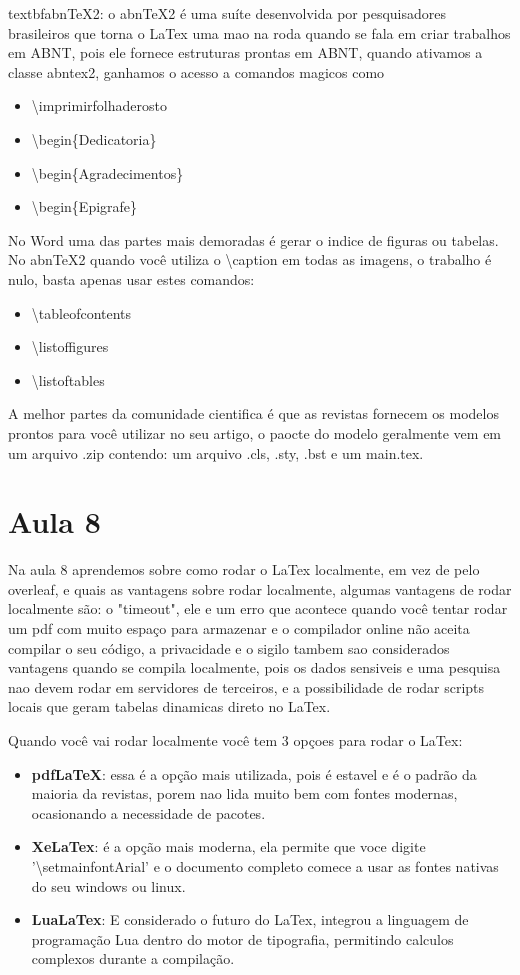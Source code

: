 textbf{abnTeX2}: o abnTeX2 é uma suíte desenvolvida por pesquisadores brasileiros que torna o LaTex uma mao na roda quando se fala em criar trabalhos em ABNT, pois ele fornece estruturas prontas em ABNT, quando ativamos a classe abntex2, ganhamos o acesso a comandos magicos como 
\begin{itemize}
    \item \textbackslash imprimirfolhaderosto
    \item \textbackslash begin\{Dedicatoria\}
    \item \textbackslash begin\{Agradecimentos\}
    \item \textbackslash begin\{Epigrafe\}
\end{itemize}


No Word uma das partes mais demoradas é gerar o indice de figuras ou tabelas. No abnTeX2 quando você utiliza o \textbackslash caption em todas as imagens, o trabalho é nulo, basta apenas usar estes comandos: 
\begin{itemize}
    \item \textbackslash tableofcontents
    \item \textbackslash listoffigures
    \item \textbackslash listoftables
\end{itemize}


A melhor partes da comunidade cientifica é que as revistas fornecem os modelos prontos para você utilizar no seu artigo, o paocte do modelo geralmente vem em um arquivo .zip contendo: um arquivo .cls, .sty, .bst e um main.tex.
\section{Aula 8}
Na aula 8 aprendemos sobre como rodar o LaTex localmente, em vez de pelo overleaf, e quais as vantagens sobre rodar localmente, algumas vantagens de rodar localmente são: o "timeout", ele e um erro que acontece quando você tentar rodar um pdf com muito espaço para armazenar e o compilador online não aceita compilar o seu código, a privacidade e o sigilo tambem sao considerados vantagens quando se compila localmente, pois os dados sensiveis e uma pesquisa nao devem rodar em servidores de terceiros, e a possibilidade de rodar scripts locais que geram tabelas dinamicas direto no LaTex. 


Quando você vai rodar localmente você tem 3 opçoes para rodar o LaTex:

 \begin{itemize}
    \item  \textbf{pdfLaTeX}: essa é a opção mais utilizada, pois é estavel e é o padrão da maioria da revistas, porem nao lida muito bem com fontes modernas, ocasionando a necessidade de pacotes.
    \item \textbf{XeLaTex}: é a opção mais moderna, ela permite que voce digite '\textbackslash setmainfontArial' e o documento completo comece a usar as fontes nativas do seu windows ou linux.
    \item \textbf{LuaLaTex}: E considerado o futuro do LaTex, integrou a linguagem de programação Lua dentro do motor de tipografia, permitindo calculos complexos durante a compilação.
 \end{itemize}   

